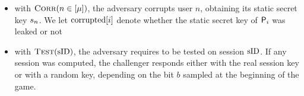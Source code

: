 \begin{itemize}
	\item with $\CorruptO(n \in [\maxusers])$, the adversary corrupts user $n$, obtaining its static secret key $\ssk_n$. We let $\corrupted[{i}]$ denote whether the static secret key of  $\User[{i}]$ was leaked or not
	\item with $\TestO(\sID)$, the adversary requires to be tested on session $\sID$. If any session was computed, the challenger responds either with the real session key or with a random key, depending on the bit $b$ sampled at the beginning of the game.
\end{itemize}

\begin{figure}[h!]
	\centering
	\hspace*{-0.1cm}
\end{figure}
